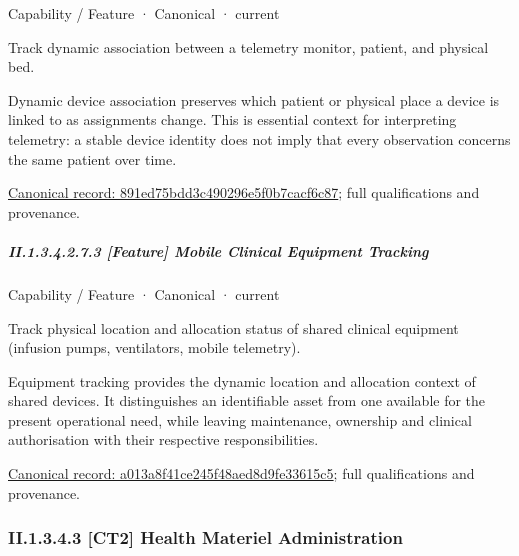 \label{element:891ed75bdd3c490296e5f0b7cacf6c87}
{\small Capability / Feature · Canonical · current}\par

Track dynamic association between a telemetry monitor, patient, and physical bed.



Dynamic device association preserves which patient or physical place a device is linked to as assignments change. This is essential context for interpreting telemetry: a stable device identity does not imply that every observation concerns the same patient over time.


{\footnotesize \href{../../../../../../../continuum/strategy/capability/feature/891ed75bdd3c490296e5f0b7cacf6c87.md}{Canonical record: 891ed75bdd3c490296e5f0b7cacf6c87}; full qualifications and provenance.}\par
\subparagraph*{II.1.3.4.2.7.3 [Feature] Mobile Clinical Equipment Tracking}
\label{navigation:II.1.3.4.2.7.3}

\label{element:a013a8f41ce245f48aed8d9fe33615c5}
{\small Capability / Feature · Canonical · current}\par

Track physical location and allocation status of shared clinical equipment (infusion pumps, ventilators, mobile telemetry).



Equipment tracking provides the dynamic location and allocation context of shared devices. It distinguishes an identifiable asset from one available for the present operational need, while leaving maintenance, ownership and clinical authorisation with their respective responsibilities.


{\footnotesize \href{../../../../../../../continuum/strategy/capability/feature/a013a8f41ce245f48aed8d9fe33615c5.md}{Canonical record: a013a8f41ce245f48aed8d9fe33615c5}; full qualifications and provenance.}\par
\subsubsection*{II.1.3.4.3 [CT2] Health Materiel Administration}
\label{navigation:II.1.3.4.3}

